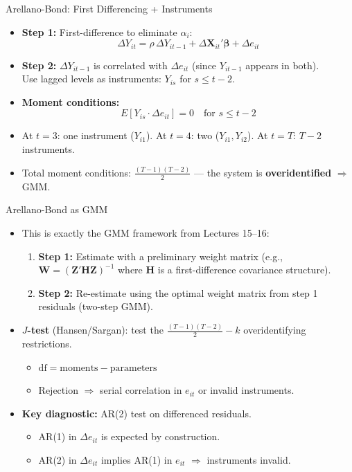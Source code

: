 \documentclass[aspectratio=169, handout, t]{beamer}
\numberwithin{equation}{section}
\begin{document}
\begin{frame}{Arellano-Bond: First Differencing + Instruments}
\begin{itemize}
\item \textbf{Step 1:} First-difference to eliminate $\alpha_i$:
$$\Delta Y_{it}=\rho\,\Delta Y_{it-1}+\Delta\bm{X}_{it}'\bm{\beta}+\Delta e_{it}$$\pause
\item \textbf{Step 2:} $\Delta Y_{it-1}$ is correlated with $\Delta e_{it}$ (since $Y_{it-1}$ appears in both).\\
Use \alert{lagged levels} as instruments: $Y_{is}$ for $s\leq t-2$.\pause
\item \textbf{Moment conditions:}
$$E[Y_{is}\cdot \Delta e_{it}]=0 \quad\text{for } s\leq t-2$$
\item At $t=3$: one instrument ($Y_{i1}$). At $t=4$: two ($Y_{i1},Y_{i2}$). At $t=T$: $T-2$ instruments.
\item Total moment conditions: $\frac{(T-1)(T-2)}{2}$ --- the system is \textbf{overidentified} $\Rightarrow$ GMM.
\end{itemize}
\end{frame}

\begin{frame}{Arellano-Bond as GMM}
\begin{itemize}
\item This is exactly the GMM framework from Lectures 15--16:\pause
\begin{enumerate}
\item \textbf{Step 1:} Estimate with a preliminary weight matrix (e.g., $\bm{W}=(\bm{Z}'\bm{H}\bm{Z})^{-1}$ where $\bm{H}$ is a first-difference covariance structure).
\item \textbf{Step 2:} Re-estimate using the optimal weight matrix from step 1 residuals (two-step GMM).
\end{enumerate}\pause
\item \textbf{$J$-test} (Hansen/Sargan): test the $\frac{(T-1)(T-2)}{2}-k$ overidentifying restrictions.
\begin{itemize}
\item $\text{df}=\text{moments}-\text{parameters}$
\item Rejection $\Rightarrow$ serial correlation in $e_{it}$ or invalid instruments.
\end{itemize}\pause
\item \textbf{Key diagnostic:} AR(2) test on differenced residuals.
\begin{itemize}
\item AR(1) in $\Delta e_{it}$ is expected by construction.
\item AR(2) in $\Delta e_{it}$ implies AR(1) in $e_{it}$ $\Rightarrow$ instruments invalid.
\end{itemize}
\end{itemize}
\end{frame}
\end{document}
